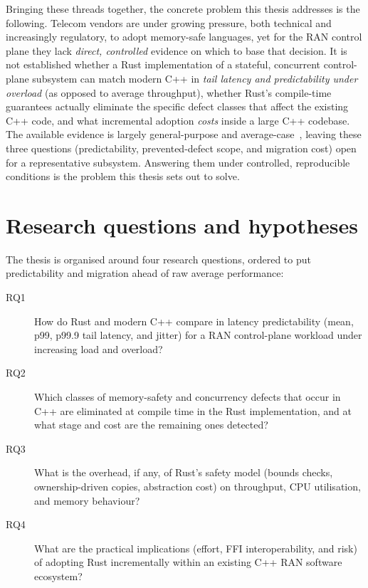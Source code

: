 \documentclass[english,twoside,openright,a4paper,censored,csm,software-track-2020]{HYthesisML}
\begin{document}
Bringing these threads together, the concrete problem this thesis addresses is the following.
Telecom vendors are under growing pressure, both technical and increasingly regulatory, to adopt
memory-safe languages, yet for the RAN control plane they lack \emph{direct, controlled}
evidence on which to base that decision. It is not established whether a Rust implementation of
a stateful, concurrent control-plane subsystem can match modern C++ in \emph{tail latency and
predictability under overload} (as opposed to average throughput), whether Rust's compile-time
guarantees actually eliminate the specific defect classes that affect the existing C++ code,
and what incremental adoption \emph{costs} inside a large C++ codebase. The available evidence
is largely general-purpose and average-case~\cite{balasubramanian2017rust,qin2020rust}, leaving
these three questions (predictability, prevented-defect scope, and migration cost) open for a
representative subsystem. Answering them under controlled, reproducible conditions is the
problem this thesis sets out to solve.

\section{Research questions and hypotheses}\label{sec:rqs}
The thesis is organised around four research questions, ordered to put predictability and
migration ahead of raw average performance:

\begin{description}
  \item[RQ1] How do Rust and modern C++ compare in latency predictability (mean, p99,
        p99.9 tail latency, and jitter) for a RAN control-plane workload under increasing
        load and overload?
  \item[RQ2] Which classes of memory-safety and concurrency defects that occur in C++ are
        eliminated at compile time in the Rust implementation, and at what stage and cost
        are the remaining ones detected?
  \item[RQ3] What is the overhead, if any, of Rust's safety model (bounds checks,
        ownership-driven copies, abstraction cost) on throughput, CPU utilisation, and
        memory behaviour?
  \item[RQ4] What are the practical implications (effort, FFI interoperability, and risk)
        of adopting Rust incrementally within an existing C++ RAN software ecosystem?
\end{description}
\end{document}
